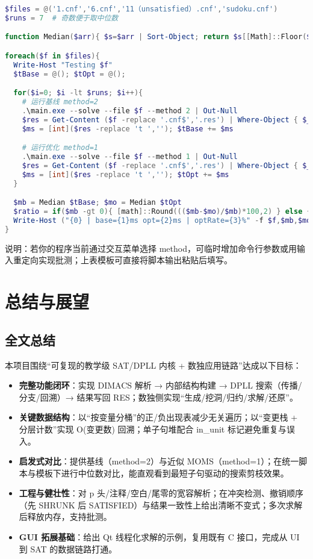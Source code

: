 \documentclass[UTF8]{ctexart}
\begin{document}
\begin{lstlisting}[language=powershell]
$files = @('1.cnf','6.cnf','11（unsatisfied）.cnf','sudoku.cnf')
$runs = 7  # 奇数便于取中位数

function Median($arr){ $s=$arr | Sort-Object; return $s[[Math]::Floor($s.Count/2)] }

foreach($f in $files){
  Write-Host "Testing $f"
  $tBase = @(); $tOpt = @();

  for($i=0; $i -lt $runs; $i++){
    # 运行基线 method=2
    .\main.exe --solve --file $f --method 2 | Out-Null
    $res = Get-Content ($f -replace '.cnf$','.res') | Where-Object { $_ -like 't *' }
    $ms = [int]($res -replace 't ',''); $tBase += $ms

    # 运行优化 method=1
    .\main.exe --solve --file $f --method 1 | Out-Null
    $res = Get-Content ($f -replace '.cnf$','.res') | Where-Object { $_ -like 't *' }
    $ms = [int]($res -replace 't ',''); $tOpt += $ms
  }

  $mb = Median $tBase; $mo = Median $tOpt
  $ratio = if($mb -gt 0){ [math]::Round((($mb-$mo)/$mb)*100,2) } else { 0 }
  Write-Host ("{0} | base={1}ms opt={2}ms | optRate={3}%" -f $f,$mb,$mo,$ratio)
}
\end{lstlisting}

说明：若你的程序当前通过交互菜单选择 method，可临时增加命令行参数或用输入重定向实现批测；上表模板可直接将脚本输出粘贴后填写。

\section{总结与展望}
\subsection{全文总结}
本项目围绕“可复现的教学级 SAT/DPLL 内核 + 数独应用链路”达成以下目标：
\begin{itemize}
  \item \textbf{完整功能闭环}：实现 DIMACS 解析 → 内部结构构建 → DPLL 搜索（传播/分支/回溯）→ 结果写回 RES；数独侧实现“生成/挖洞/归约/求解/还原”。
  \item \textbf{关键数据结构}：以“按变量分桶”的正/负出现表减少无关遍历；以“变更栈 + 分层计数”实现 O(变更数) 回溯；单子句堆配合 in\_unit 标记避免重复与误入。
  \item \textbf{启发式对比}：提供基线（method=2）与近似 MOMS（method=1）；在统一脚本与模板下进行中位数对比，能直观看到最短子句驱动的搜索剪枝效果。
  \item \textbf{工程与健壮性}：对 p 头/注释/空白/尾零的宽容解析；在冲突检测、撤销顺序（先 SHRUNK 后 SATISFIED）与结果一致性上给出清晰不变式；多次求解后释放内存，支持批测。
  \item \textbf{GUI 拓展基础}：给出 Qt 线程化求解的示例，复用既有 C 接口，完成从 UI 到 SAT 的数据链路打通。
\end{itemize}
\end{document}
